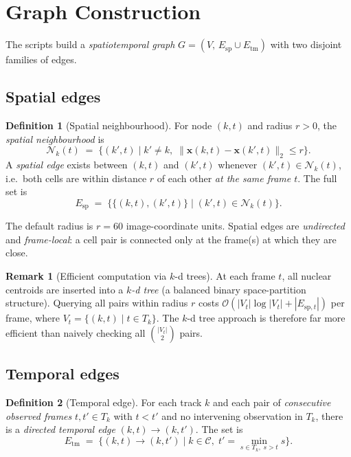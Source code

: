 \documentclass[11pt,a4paper]{article}
\theoremstyle{definition}
\newtheorem{definition}{Definition}[section]
\newtheorem{remark}{Remark}[section]
\theoremstyle{plain}
\newcommand{\Nb}[2]{\mathcal{N}_{#1}(#2)}
\newcommand{\1}[1]{\mathbf{1}\!\left[#1\right]}
\begin{document}
\section{Graph Construction}

The scripts build a \emph{spatiotemporal graph}
$G = (V,\, E_{\mathrm{sp}} \cup E_{\mathrm{tm}})$
with two disjoint families of edges.

\subsection{Spatial edges}

\begin{definition}[Spatial neighbourhood]\label{def:spatial-nb}
For node $(k,t)$ and radius $r > 0$, the \emph{spatial neighbourhood} is
\[
  \Nb{k}{t} \;=\;
  \bigl\{(k',t) \;\big|\; k' \neq k,\;
    \|\bm{x}(k,t) - \bm{x}(k',t)\|_2 \leq r\bigr\}.
\]
A \emph{spatial edge} exists between $(k,t)$ and $(k',t)$ whenever
$(k',t) \in \Nb{k}{t}$, i.e.\ both cells are within distance $r$ of each
other \emph{at the same frame $t$}. The full set is
\[
  E_{\mathrm{sp}} \;=\;
  \bigl\{\{(k,t),(k',t)\} \;\big|\; (k',t) \in \Nb{k}{t}\bigr\}.
\]
\end{definition}

The default radius is $r = 60$ image-coordinate units. Spatial edges are
\emph{undirected} and \emph{frame-local}: a cell pair is connected only at
the frame(s) at which they are close.

\begin{remark}[Efficient computation via $k$-d trees]
At each frame $t$, all nuclear centroids are inserted into a
\emph{$k$-d tree} (a balanced binary space-partition structure).
Querying all pairs within radius $r$ costs
$\mathcal{O}(|V_t|\log|V_t| + |E_{\mathrm{sp},t}|)$ per frame,
where $V_t = \{(k,t) \mid t \in T_k\}$.
The $k$-d tree approach is therefore far more efficient than naively
checking all $\binom{|V_t|}{2}$ pairs.
\end{remark}

\subsection{Temporal edges}

\begin{definition}[Temporal edge]\label{def:temporal-edge}
For each track $k$ and each pair of \emph{consecutive observed frames}
$t, t' \in T_k$ with $t < t'$ and no intervening observation in $T_k$,
there is a \emph{directed temporal edge} $(k,t) \to (k,t')$. The set is
\[
  E_{\mathrm{tm}} \;=\;
  \bigl\{(k,t) \to (k,t') \;\big|\; k \in \mathcal{C},\;
    t' = \min_{s \in T_k,\; s > t} s\bigr\}.
\]
\end{definition}
\end{document}

